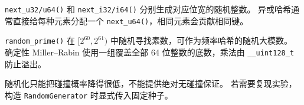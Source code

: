 \texttt{next\_u32/u64()} 和 \texttt{next\_i32/i64()} 分别生成对应位宽的随机整数。
异或哈希通常直接给每种元素分配一个 \texttt{next\_u64()}，相同元素会贡献相同键。

\texttt{random\_prime()} 在 $[2^{60},2^{61})$ 中随机寻找素数，可作为频率哈希的随机大模数。
确定性 Miller--Rabin 使用一组覆盖全部 64 位整数的底数，乘法由 \texttt{\_\_uint128\_t} 防止溢出。

\begin{icpcwarning}[随机哈希]
  随机化只能把碰撞概率降得很低，不能提供绝对无碰撞保证。
  若需要复现实验，构造 \texttt{RandomGenerator} 时显式传入固定种子。
\end{icpcwarning}
